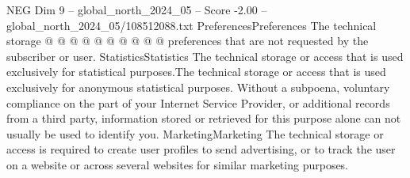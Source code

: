 \begin{textsample}{NEG Dim 9 – global\_north\_2024\_05 – Score -2.00 – global\_north\_2024\_05/108512088.txt}
PreferencesPreferences The technical storage @ @ @ @ @ @ @ @ @ @ preferences that are not requested by the subscriber or user.
StatisticsStatistics The technical storage or access that is used exclusively for statistical purposes.The technical storage or access that is used exclusively for anonymous statistical purposes.
Without a subpoena, voluntary compliance on the part of your Internet Service Provider, or additional records from a third party, information stored or retrieved for this purpose alone can not usually be used to identify you.
MarketingMarketing The technical storage or access is required to create user profiles to send advertising, or to track the user on a website or across several websites for similar marketing purposes.

\end{textsample}
